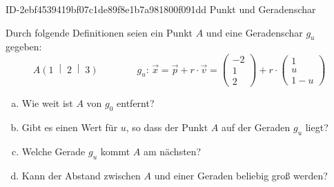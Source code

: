 \begin{exercise}
      {ID-2ebf4539419bf07c1de89f8e1b7a981800f091dd}
      {Punkt und Geradenschar}
  \ifproblem\problem\par
    Durch folgende Definitionen seien ein Punkt $A$ und eine Geradenschar $g_u$ gegeben:
    \begin{equation*}
      A\left(1\;\middle|\;2\;\middle|\;3\right)
      \qquad
      \qquad
      g_u:\,\vec x=\vec p+r\cdot\vec v=\begin{pmatrix}-2\\1\\2\end{pmatrix}+r\cdot\begin{pmatrix}1\\u\\1-u\end{pmatrix}
    \end{equation*}
    \begin{enumerate}[a)]
      \item Wie weit ist $A$ von $g_0$ entfernt?
      \item Gibt es einen Wert für $u$, so dass der Punkt $A$ auf der
            Geraden $g_u$ liegt?
      \item Welche Gerade $g_u$ kommt $A$ am nächsten?
      \item Kann der Abstand zwischen $A$ und einer Geraden beliebig groß werden?
    \end{enumerate}
  \fi
\end{exercise}
